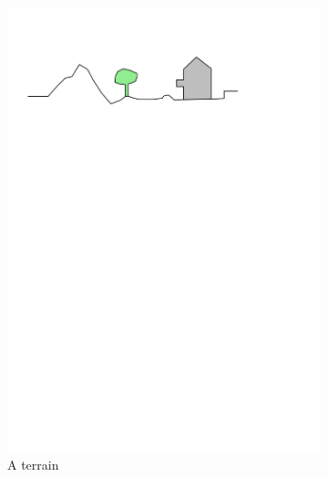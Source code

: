 \begin{figure}[b]
  \centering
  \begin{subfigure}[b]{0.45\linewidth}
    \centering
    \includegraphics[page=1,width=\linewidth]{figs/dimgis}
    \caption{A terrain}
  \end{subfigure}%
  \qquad %
  \begin{subfigure}[b]{0.45\linewidth}
    \centering

\end{subfigure}
\end{figure}
